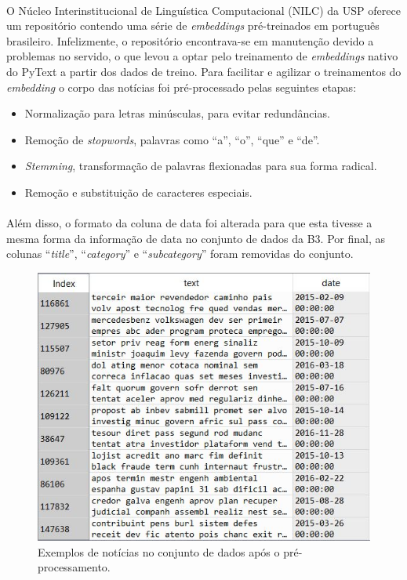 \documentclass[grad,numbers]{coppe}
\begin{document}
  			\paragraph{}O Núcleo Interinstitucional de Linguística Computacional (NILC) da USP oferece um repositório\cite{nilc-repo} contendo uma série de \textit{embeddings} pré-treinados em português brasileiro. Infelizmente, o repositório encontrava-se em manutenção devido a problemas no servido, o que levou a optar pelo treinamento de \textit{embeddings} nativo do PyText a partir dos dados de treino. Para facilitar e agilizar o treinamentos do \textit{embedding} o corpo das notícias foi pré-processado pelas seguintes etapas:
  			\begin{itemize}
  				\item Normalização para letras minúsculas, para evitar redundâncias.
  				\item Remoção de \textit{stopwords}, palavras como ``a'', ``o'', ``que'' e ``de''.
  				\item \textit{Stemming}, transformação de palavras flexionadas para sua forma radical.
  				\item Remoção e substituição de caracteres especiais.
  			\end{itemize}
  			\paragraph{}Além disso, o formato da coluna de data foi alterada para que esta tivesse a mesma forma da informação de data no conjunto de dados da B3. Por final, as colunas ``\textit{title}'', ``\textit{category}'' e ``\textit{subcategory}'' foram removidas do conjunto.
	  		\begin{figure}[h]
	  			\centering
					{\includegraphics[width=13cm]{folha-pp-dataset}
  				\caption{Exemplos de notícias no conjunto de dados após o pré-processamento.}
  				\label{fig:folha-pp-dataset-fig}}
  			\end{figure}
  			
\end{document}
